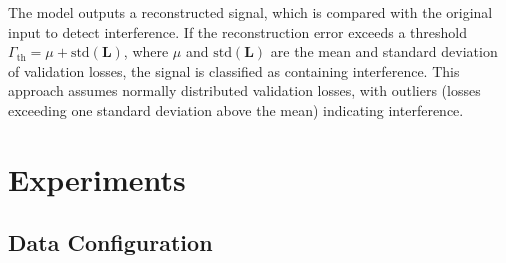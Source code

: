 \documentclass[conference]{IEEEtran}
\begin{document}
The model outputs a reconstructed signal, which is compared with the original input to detect interference. If the reconstruction error exceeds a threshold $\Gamma_{\text{th}} = \mu + \text{std}(\mathbf{L})$, where $\mu$ and $\text{std}(\mathbf{L})$ are the mean and standard deviation of validation losses, the signal is classified as containing interference. This approach assumes normally distributed validation losses, with outliers (losses exceeding one standard deviation above the mean) indicating interference.



\section{Experiments}
\label{sec:experiments}





\subsection{Data Configuration}
\end{document}
